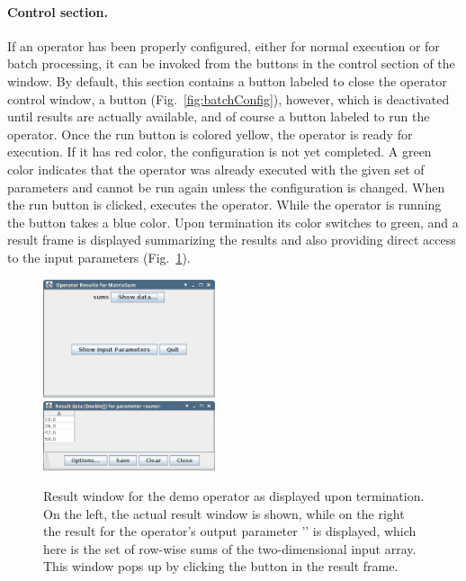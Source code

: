 \paragraph{Control section.} If an operator has been properly configured,
either for normal execution or for batch processing, it can be invoked from the
buttons in the control section of the window. By default, this section contains
a button labeled  to close the operator control window, a button
 (Fig.~\ref{fig:batchConfig}), however, which is
deactivated until results are actually available, and of course a button labeled
 to run the operator.
Once the run button is colored yellow, the operator is ready for execution. 
If it has red color, the configuration is not yet completed. A green color
indicates that the operator was already executed with the given set of
parameters and cannot be run again unless the configuration is changed. When the
run button is clicked, \alida executes the operator. While the operator is
running the button takes a blue color. Upon termination its color switches to
green, and a result frame is displayed summarizing the results and also
providing direct access to the input parameters (Fig.~\ref{fig:OpRunnerResult}).

\begin{center}
\begin{figure}[t]
\begin{center}
\hspace*{-3cm}
\includegraphics[width=0.45\textwidth,clip, trim= 0 0 0 0]
				{../images/screenShotOpRunnerResult.png}\\[-1.5cm]
\hspace*{5cm}				
\includegraphics[width=0.45\textwidth,clip, trim= 0 0 0 0]
				{../images/screenShotOpRunnerResultValues.png}
\caption{\label{fig:OpRunnerResult}Result window for the demo operator
 as displayed upon termination. On the left, the actual result
window is shown, while on the right the result for the operator's output
parameter '' is displayed, which here is the set of row-wise sums of
the two-dimensional input array. This window pops up by clicking the
 button in the result frame.}
\end{center}
\end{figure}
\end{center}

